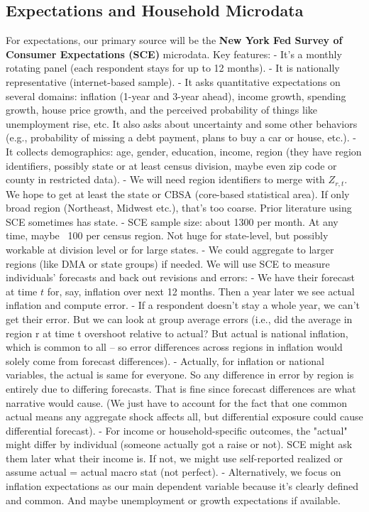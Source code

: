 \documentclass[12pt]{article}
\begin{document}
\subsection{Expectations and Household Microdata}
For expectations, our primary source will be the \textbf{New York Fed Survey of Consumer Expectations (SCE)} microdata. Key features: - It's a monthly rotating panel (each respondent stays for up to 12 months). - It is nationally representative (internet-based sample). - It asks quantitative expectations on several domains: inflation (1-year and 3-year ahead), income growth, spending growth, house price growth, and the perceived probability of things like unemployment rise, etc. It also asks about uncertainty and some other behaviors (e.g., probability of missing a debt payment, plans to buy a car or house, etc.). - It collects demographics: age, gender, education, income, region (they have region identifiers, possibly state or at least census division, maybe even zip code or county in restricted data). - We will need region identifiers to merge with $Z_{r,t}$. We hope to get at least the state or CBSA (core-based statistical area). If only broad region (Northeast, Midwest etc.), that's too coarse. Prior literature using SCE sometimes has state. - SCE sample size: about 1300 per month. At any time, maybe ~100 per census region. Not huge for state-level, but possibly workable at division level or for large states. - We could aggregate to larger regions (like DMA or state groups) if needed.
We will use SCE to measure individuals' forecasts and back out revisions and errors: - We have their forecast at time $t$ for, say, inflation over next 12 months. Then a year later we see actual inflation and compute error. - If a respondent doesn't stay a whole year, we can't get their error. But we can look at group average errors (i.e., did the average in region r at time t overshoot relative to actual? But actual is national inflation, which is common to all – so error differences across regions in inflation would solely come from forecast differences). - Actually, for inflation or national variables, the actual is same for everyone. So any difference in error by region is entirely due to differing forecasts. That is fine since forecast differences are what narrative would cause. (We just have to account for the fact that one common actual means any aggregate shock affects all, but differential exposure could cause differential forecast). - For income or household-specific outcomes, the "actual" might differ by individual (someone actually got a raise or not). SCE might ask them later what their income is. If not, we might use self-reported realized or assume actual = actual macro stat (not perfect). - Alternatively, we focus on inflation expectations as our main dependent variable because it's clearly defined and common. And maybe unemployment or growth expectations if available.
\end{document}

